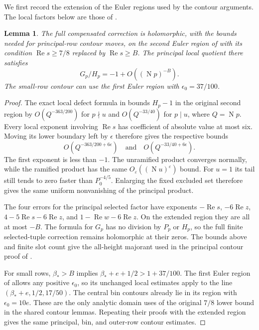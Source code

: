 \documentclass[11pt]{article}
\newtheorem{lemma}[theorem]{Lemma}
\newcommand{\Ree}{\operatorname{Re}}
\newcommand{\NF}{\operatorname{N}}
\begin{document}
We first record the extension of the Euler regions used by the contour
arguments. The local factors below are those of
\cite[Equations (5.13a)--(5.13c)]{OAI}.

\begin{lemma}\label{lem:analytic}
The full compensated correction is holomorphic, with the bounds needed
for principal-row contour moves, on the second Euler region of \cite{OAI}
with its condition $\Ree s\ge7/8$ replaced by $\Ree s\ge B$. The
principal local quotient there satisfies
\[
       G_p/H_p=-1+O((\NF p)^{-B}).
\]
The small-row contour can use the first Euler region with
$\epsilon_0=37/100$.
\end{lemma}

\begin{proof}
The exact local defect formula in \cite[local Euler lemma]{OAI} bounds
$H_p-1$ in the original second
region by $O(Q^{-363/200})$ for $p\nmid u$ and $O(Q^{-33/40})$
for $p\mid u$, where $Q=\NF p$. Every local exponent involving
$\Ree s$ has coefficient of absolute value at most six. Moving its
lower boundary left by $\epsilon$ therefore gives the respective bounds
\[
 O(Q^{-363/200+6\epsilon})\quad\text{and}\quad
 O(Q^{-33/40+6\epsilon}).
\]
The first exponent is less than $-1$. The unramified product converges
normally, while the ramified product has the same $O_\varepsilon((\NF
u)^\varepsilon)$ bound. For $u=1$ its tail still tends to zero faster
than $P_0^{-4/5}$. Enlarging the fixed excluded set therefore gives the
same uniform nonvanishing of the principal product.

The four errors for the principal selected factor have exponents
$-\Ree s$, $-6\Ree z$, $4-5\Ree s-6\Ree z$, and
$1-\Ree w-6\Ree z$. On the extended region they are all at most
$-B$. The formula for $G_p$ has no division by $P_p$ or $H_p$, so the
full finite selected-tuple correction remains holomorphic at their zeros.
The bounds above and finite slot count give the all-height majorant used
in the principal contour proof of \cite{OAI}.

For small rows, $\beta_*>B$ implies
$\beta_*+e+1/2>1+37/100$. The first Euler region of \cite{OAI}
allows any positive $\epsilon_0$, so its unchanged local estimates apply
to the line $(\beta_*+e,1/2,17/50)$. The central bin contours already
lie in its region with $\epsilon_0=10e$. These are the only analytic
domain uses of the original $7/8$ lower bound in the shared contour
lemmas. Repeating their proofs with the extended region gives the same
principal, bin, and outer-row contour estimates.
\end{proof}
\end{document}
